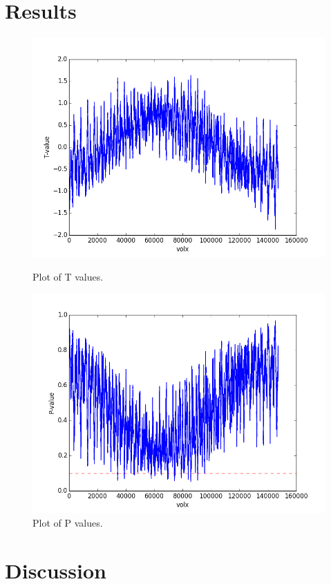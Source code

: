 \documentclass[11pt]{article}
\begin{document}
\section{Results}
\begin{figure}[!htb]
  \centering
  \begin{minipage}[b]{0.4\textwidth}
    \includegraphics[width=\textwidth]{T_value}
    \caption{Plot of T values.}
  \end{minipage}
  \hfill
  \begin{minipage}[b]{0.4\textwidth}
    \includegraphics[width=\textwidth]{p_value}
    \caption{Plot of P values.}
  \end{minipage}
\end{figure}


\section{Discussion}



\end{document}
